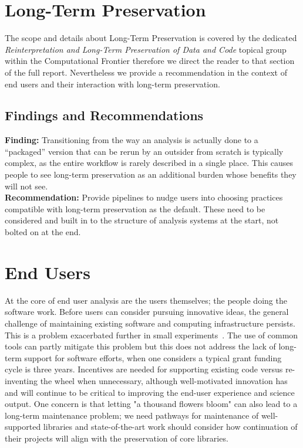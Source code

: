 \section{Long-Term Preservation}
The scope and details about Long-Term Preservation is covered by the dedicated \textit{Reinterpretation and Long-Term Preservation of Data and Code} topical group~\cite{Bailey:2022pdq} within the Computational Frontier therefore we direct the reader to that section of the full report. Nevertheless we provide a recommendation in the context of end users and their interaction with long-term preservation.
\subsection{Findings and Recommendations}
\textbf{Finding:} Transitioning from the way an analysis is actually done to a “packaged” version that can be rerun by an outsider from scratch is typically complex, as the entire workflow is rarely described in a single place. This causes people to see long-term preservation as an additional burden whose benefits they will not see.\\
\textbf{Recommendation:} Provide pipelines to nudge users into choosing practices compatible with long-term preservation as the default. These need to be considered and built in to the structure of analysis systems at the start, not bolted on at the end.

\section{End Users}

At the core of end user analysis are the users themselves; the people doing the software work. Before users can consider pursuing innovative ideas, the general challenge of maintaining existing software and computing infrastructure persists. This is a problem exacerbated further in small experiments~\cite{FASER:2022yqp}. The use of common tools can partly mitigate this problem but this does not address the lack of long-term support for software efforts, when one considers a typical grant funding cycle is three years. Incentives are needed for supporting existing code versus re-inventing the wheel when unnecessary, although well-motivated innovation has and will continue to be critical to improving the end-user experience and science output. One concern is that letting "a thousand flowers bloom" can also lead to a long-term maintenance problem; we need pathways for maintenance of well-supported libraries and state-of-the-art work should consider how continuation of their projects will align with the preservation of core libraries. 

